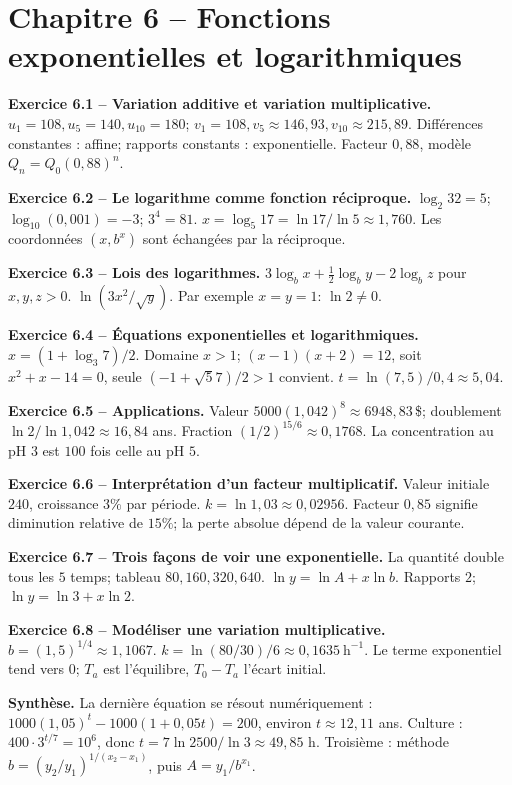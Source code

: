 \documentclass[11pt,a4paper,openany]{book}
\begin{document}
\chapter*{Chapitre 6 -- Fonctions exponentielles et logarithmiques}
\begin{answerbox}
\textbf{Exercice 6.1 -- Variation additive et variation multiplicative.} $u_1=108,u_5=140,u_{10}=180$; $v_1=108,v_5\approx146{,}93,v_{10}\approx215{,}89$. Différences constantes : affine; rapports constants : exponentielle. Facteur $0{,}88$, modèle $Q_n=Q_0(0{,}88)^n$.\par
\textbf{Exercice 6.2 -- Le logarithme comme fonction réciproque.} $\log_2 32=5$; $\log_{10}(0{,}001)=-3$; $3^4=81$. $x=\log_5 17=\ln17/\ln5\approx1{,}760$. Les coordonnées $(x,b^x)$ sont échangées par la réciproque.\par
\textbf{Exercice 6.3 -- Lois des logarithmes.} $3\log_bx+\frac12\log_by-2\log_bz$ pour $x,y,z>0$. $\ln(3x^2/\sqrt y)$. Par exemple $x=y=1$: $\ln2\neq0$.\par
\textbf{Exercice 6.4 -- Équations exponentielles et logarithmiques.} $x=(1+\log_3 7)/2$. Domaine $x>1$; $(x-1)(x+2)=12$, soit $x^2+x-14=0$, seule $(-1+\sqrt57)/2>1$ convient. $t=\ln(7{,}5)/0{,}4\approx5{,}04$.\par
\textbf{Exercice 6.5 -- Applications.} Valeur $5000(1{,}042)^8\approx6948{,}83\,$\$; doublement $\ln2/\ln1{,}042\approx16{,}84$ ans. Fraction $(1/2)^{15/6}\approx0{,}1768$. La concentration au pH $3$ est $100$ fois celle au pH $5$.\par
\textbf{Exercice 6.6 -- Interprétation d'un facteur multiplicatif.} Valeur initiale $240$, croissance $3\%$ par période. $k=\ln1{,}03\approx0{,}02956$. Facteur $0{,}85$ signifie diminution relative de $15\%$; la perte absolue dépend de la valeur courante.\par
\textbf{Exercice 6.7 -- Trois façons de voir une exponentielle.} La quantité double tous les $5$ temps; tableau $80,160,320,640$. $\ln y=\ln A+x\ln b$. Rapports $2$; $\ln y=\ln3+x\ln2$.\par
\textbf{Exercice 6.8 -- Modéliser une variation multiplicative.} $b=(1{,}5)^{1/4}\approx1{,}1067$. $k=\ln(80/30)/6\approx0{,}1635\ \mathrm h^{-1}$. Le terme exponentiel tend vers $0$; $T_a$ est l'équilibre, $T_0-T_a$ l'écart initial.\par
\medskip\textbf{Synthèse.} La dernière équation se résout numériquement : $1000(1{,}05)^t-1000(1+0{,}05t)=200$, environ $t\approx12{,}11$ ans. Culture : $400\cdot3^{t/7}=10^6$, donc $t=7\ln2500/\ln3\approx49{,}85$ h. Troisième : méthode $b=(y_2/y_1)^{1/(x_2-x_1)}$, puis $A=y_1/b^{x_1}$.
\end{answerbox}
\end{document}
